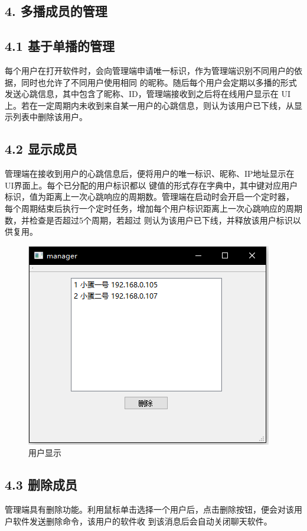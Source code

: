 \documentclass[UTF8]{ctexart}
\begin{document}
\subsection*{\textbf{4. 多播成员的管理}}
\subsection*{4.1 基于单播的管理}
每个用户在打开软件时，会向管理端申请唯一标识，作为管理端识别不同用户的依据，同时也允许了不同用户使用相同
的昵称。随后每个用户会定期以多播的形式发送心跳信息，其中包含了昵称、ID，管理端接收到之后将在线用户显示在
UI上。若在一定周期内未收到来自某一用户的心跳信息，则认为该用户已下线，从显示列表中删除该用户。

\subsection*{4.2 显示成员}
管理端在接收到用户的心跳信息后，便将用户的唯一标识、昵称、IP地址显示在UI界面上。每个已分配的用户标识都以
键值的形式存在字典中，其中键对应用户标识，值为距离上一次心跳响应的周期数。管理端在启动时会开启一个定时器，
每个周期结束后执行一个定时任务，增加每个用户标识距离上一次心跳响应的周期数，并检查是否超过5个周期，若超过
则认为该用户已下线，并释放该用户标识以供复用。

\begin{figure}[H]
\includegraphics[width=\textwidth]{pic/userlist.PNG}
\caption{用户显示}
\end{figure}

\subsection*{4.3 删除成员}
管理端具有删除功能。利用鼠标单击选择一个用户后，点击删除按钮，便会对该用户软件发送删除命令，该用户的软件收
到该消息后会自动关闭聊天软件。
\end{document}
